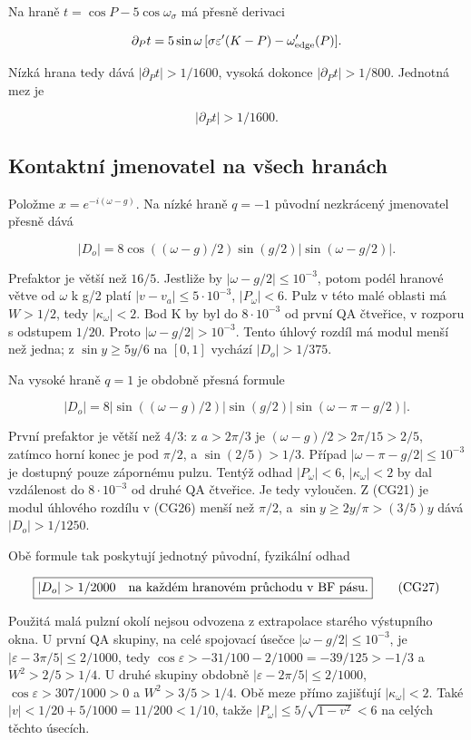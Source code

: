 \documentclass[11pt,a4paper]{article}
\theoremstyle{remark}\newtheorem{remark}[theorem]{Poznámka}
\numberwithin{equation}{section}
\begin{document}
Na hraně \(t=\cos P-5\cos\omega_\sigma\) má přesně derivaci

\[
\partial_Pt
=5\sin\omega\,[\sigma\varepsilon'(K-P)-\omega_{\rm edge}'(P)].
\]

Nízká hrana tedy dává \(|\partial_Pt|>1/1600\), vysoká dokonce
\(|\partial_Pt|>1/800\). Jednotná mez je

\[
\boxed{|\partial_Pt|>1/1600.}
\tag{CG24}
\]

\hypertarget{kontaktnuxed-jmenovatel-na-vux161ech-hranuxe1ch}{%
\subsection{Kontaktní jmenovatel na všech
hranách}\label{kontaktnuxed-jmenovatel-na-vux161ech-hranuxe1ch}}

Položme \(x=e^{-i(\omega-g)}\). Na nízké hraně \(q=-1\) původní
nezkrácený jmenovatel přesně dává

\[
|D_o|=8\cos((\omega-g)/2)\sin(g/2)
                 |\sin(\omega-g/2)|.
\tag{CG25}
\]

Prefaktor je větší než \(16/5\). Jestliže by \(|\omega-g/2|\le10^{-3}\),
potom podél hranové větve od \(\omega\) k g/2 platí
\(|v-v_a|\le5\cdot10^{-3}\), \(|P_\omega|<6\). Pulz v této malé oblasti
má \(W>1/2\), tedy \(|\kappa_\omega|<2\). Bod K by byl do
\(8\cdot10^{-3}\) od první QA čtveřice, v rozporu s odstupem \(1/20\).
Proto \(|\omega-g/2|>10^{-3}\). Tento úhlový rozdíl má modul menší než
jedna; z \(\sin y\ge5y/6\) na \([0,1]\) vychází \(|D_o|>1/375\).

Na vysoké hraně \(q=1\) je obdobně přesná formule

\[
|D_o|=8|\sin((\omega-g)/2)|\sin(g/2)
                 |\sin(\omega-\pi-g/2)|.
\tag{CG26}
\]

První prefaktor je větší než \(4/3\): z \(a>2\pi/3\) je
\((\omega-g)/2>2\pi/15>2/5\), zatímco horní konec je pod \(\pi/2\), a
\(\sin(2/5)>1/3\). Případ \(|\omega-\pi-g/2|\le10^{-3}\) je dostupný
pouze zápornému pulzu. Tentýž odhad \(|P_\omega|<6\),
\(|\kappa_\omega|<2\) by dal vzdálenost do \(8\cdot10^{-3}\) od druhé QA
čtveřice. Je tedy vyloučen. Z (CG21) je modul úhlového rozdílu v (CG26)
menší než \(\pi/2\), a \(\sin y\ge2y/\pi>(3/5)y\) dává \(|D_o|>1/1250\).

Obě formule tak poskytují jednotný původní, fyzikální odhad

\[
\boxed{|D_o|>1/2000\quad\hbox{na každém hranovém průchodu v BF pásu}.}
\tag{CG27}
\]

Použitá malá pulzní okolí nejsou odvozena z extrapolace starého
výstupního okna. U první QA skupiny, na celé spojovací úsečce
\(|\omega-g/2|\le10^{-3}\), je \(|\varepsilon-3\pi/5|\le2/1000\), tedy
\(\cos\varepsilon>-31/100-2/1000=-39/125>-1/3\) a \(W^2>2/5>1/4\). U
druhé skupiny obdobně \(|\varepsilon-2\pi/5|\le2/1000\),
\(\cos\varepsilon>307/1000>0\) a \(W^2>3/5>1/4\). Obě meze přímo
zajišťují \(|\kappa_\omega|<2\). Také \(|v|<1/20+5/1000=11/200<1/10\),
takže \(|P_\omega|\le5/\sqrt{1-v^2}<6\) na celých těchto úsecích.
\end{document}
